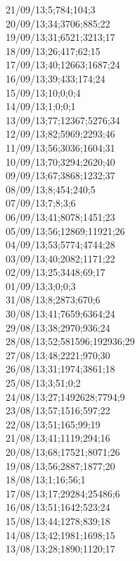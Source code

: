 21/09/13;5;784;104;3 \\
20/09/13;34;3706;885;22 \\
19/09/13;31;6521;3213;17 \\
18/09/13;26;417;62;15 \\
17/09/13;40;12663;1687;24 \\
16/09/13;39;433;174;24 \\
15/09/13;10;0;0;4 \\
14/09/13;1;0;0;1 \\
13/09/13;77;12367;5276;34 \\
12/09/13;82;5969;2293;46 \\
11/09/13;56;3036;1604;31 \\
10/09/13;70;3294;2620;40 \\
09/09/13;67;3868;1232;37 \\
08/09/13;8;454;240;5 \\
07/09/13;7;8;3;6 \\
06/09/13;41;8078;1451;23 \\
05/09/13;56;12869;11921;26 \\
04/09/13;53;5774;4744;28 \\
03/09/13;40;2082;1171;22 \\
02/09/13;25;3448;69;17 \\
01/09/13;3;0;0;3 \\
31/08/13;8;2873;670;6 \\
30/08/13;41;7659;6364;24 \\
29/08/13;38;2970;936;24 \\
28/08/13;52;581596;192936;29 \\
27/08/13;48;2221;970;30 \\
26/08/13;31;1974;3861;18 \\
25/08/13;3;51;0;2 \\
24/08/13;27;1492628;7794;9 \\
23/08/13;57;1516;597;22 \\
22/08/13;51;165;99;19 \\
21/08/13;41;1119;294;16 \\
20/08/13;68;17521;8071;26 \\
19/08/13;56;2887;1877;20 \\
18/08/13;1;16;56;1 \\
17/08/13;17;29284;25486;6 \\
16/08/13;51;1642;523;24 \\
15/08/13;44;1278;839;18 \\
14/08/13;42;1981;1698;15 \\
13/08/13;28;1890;1120;17 \\
